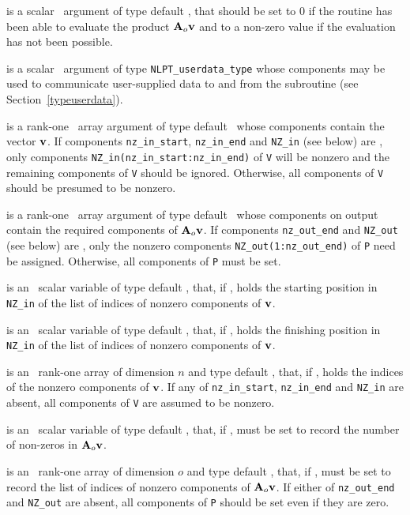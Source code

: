 \documentclass{galahad}
\begin{document}
\begin{description}
 is a scalar \intentout\ argument of type default \integer,
that should be set to 0 if the routine has been able to evaluate the
product ${\mathbf{A}}_o {\mathbf{v}}$
and to a non-zero value if the evaluation has not been possible.

 is a scalar \intentinout\ argument of type
{\tt NLPT\_userdata\_type} whose components may be used
to communicate user-supplied data to and from the
subroutine (see Section~\ref{typeuserdata}).

 is a rank-one \intentin\ array argument of type default \realdp\
whose components contain the vector ${\mathbf{v}}$.
If components
{\tt nz\_in\_start},
{\tt nz\_in\_end}
and
{\tt NZ\_in}
(see below) are \present,
only components {\tt NZ\_in(nz\_in\_start:nz\_in\_end)} of {\tt V}
will be nonzero and the remaining components of {\tt V} should be
ignored. Otherwise, all components of {\tt V} should be presumed to be nonzero.

 is a rank-one \intentout\ array argument of type default \realdp\
whose components on output contain the required components of ${\mathbf{A}}_o {\mathbf{v}}$.
If components
{\tt nz\_out\_end}
and
{\tt NZ\_out}
(see below) are \present,
only the nonzero components {\tt NZ\_out(1:nz\_out\_end)} of {\tt P}
need be assigned.
Otherwise, all components of {\tt P} must be set.

 is an \optional\ scalar variable of type default \integer,
that, if \present, holds the starting position in {\tt NZ\_in}
of the list of indices of nonzero components of ${\mathbf{v}}$.

 is an \optional\ scalar variable of type default \integer,
that, if \present, holds the finishing position in {\tt NZ\_in}
of the list of indices of nonzero components of ${\mathbf{v}}$.

 is an \optional\  rank-one array of dimension $n$
and type default \integer, that, if \present, holds the indices of the
nonzero components of ${\mathbf{v}}$. If any of
{\tt nz\_in\_start},
{\tt nz\_in\_end}
and
{\tt NZ\_in}
are absent, all components of {\tt V} are assumed to be nonzero.

\itt{nz\_out\_end} is an \optional\ scalar variable of type default \integer,
that, if \present, must be set to record the number of non-zeros in
${\mathbf{A}}_o {\mathbf{v}}$.

 is an \optional\ rank-one array of dimension $o$
and type default \integer, that, if \present, must be set to record the list
of indices of nonzero components of ${\mathbf{A}}_o {\mathbf{v}}$.
If either of
{\tt nz\_out\_end}
and
{\tt NZ\_out}
are absent, all components of {\tt P} should be set even if they are zero.


\end{description}
\end{document}
